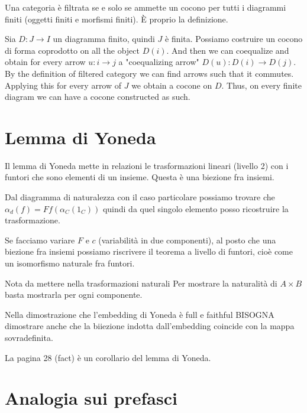 \documentclass[a4paper]{article}
\begin{document}
\begin{snippetlemma}{}
    Una categoria è filtrata
    se e solo se ammette un cocono
    per tutti i diagrammi finiti (oggetti finiti e morfismi finiti).
    È proprio la definizione.
\end{snippetlemma}

\begin{snippetproof}{}
    Sia \(D \colon J \to I\) un diagramma finito, quindi \(J\) è finita.
    Possiamo costruire un cocono
    di forma coprodotto on all the object
    \(D(i)\). And then we can coequalize
    and obtain for every arrow \(u \colon i \to j\)
    a "coequalizing arrow" \(D(u) \colon D(i) \to D(j)\).
    By the definition of filtered category
    we can find arrows such that it commutes.
    Applying this for every arrow of \(J\) we obtain a cocone on \(D\).
    Thus, on every finite diagram we can have a cocone constructed as such.
\end{snippetproof}

\pagebreak

\section{Lemma di Yoneda}

Il lemma di Yoneda mette in relazioni le trasformazioni lineari
(livello 2) con i funtori che sono elementi di un insieme. Questa è una biezione fra insiemi.

Dal diagramma di naturalezza con il caso particolare possiamo trovare che
\(\alpha_d(f) = Ff(\alpha_C(1_C))\) quindi da quel singolo elemento posso ricostruire
la trasformazione.

Se facciamo variare \(F\) e \(c\) (variabilità in due componenti),
al posto che una biezione fra insiemi possiamo riscrivere il teorema
a livello di funtori, cioè come un isomorfismo naturale fra funtori.

\begin{snippetexample}{Nota da mettere nella trasformazioni naturali}
    Per mostrare la naturalità di \(A \times B\)
    basta mostrarla per ogni componente.
\end{snippetexample}

Nella dimostrazione che l'embedding di Yoneda
è full e faithful BISOGNA dimostrare anche che la biiezione indotta dall'embedding
coincide con la mappa sovradefinita.

La pagina 28 (fact) è un corollario del lemma di Yoneda.

\section{Analogia sui prefasci}
\end{document}
